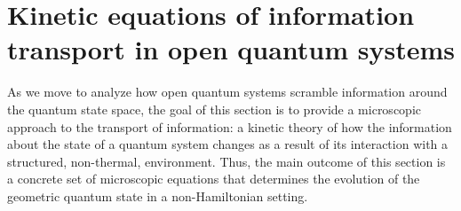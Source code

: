 \documentclass[draft,nofootinbib,pre,twocolumn,showpacs,showkeys,preprintnumbers,floatfix]{revtex4-1}
\newcommand{\1}{\mathbbm{1}}
\newcommand{\p}{\partial}
\begin{document}




\section{Kinetic equations of information transport in open quantum systems}
\label{sec:DYN}

As we move to analyze how open quantum systems scramble information around the
quantum state space, the goal of this section is to provide a microscopic approach
to the transport of information: a kinetic theory of how the information about the state
of a quantum system changes as a result of its interaction with a structured, non-thermal,
environment. Thus, the main outcome of this section is a concrete set of microscopic 
equations that determines the evolution of the geometric quantum state in a non-Hamiltonian 
setting.
\end{document}
